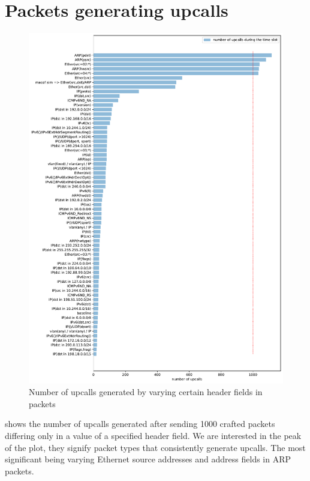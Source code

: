 \section{Packets generating upcalls}
\label{res:upcall-generators}

\begin{figure}
    \centering
    \includegraphics[width=\linewidth]{img/packet_fuzz.pdf}
    \caption{Number of upcalls generated by varying certain header fields in packets}
    \label{fig:plot-packet-fuzz}
\end{figure}

 shows the number of upcalls generated after sending 1000 crafted packets differing only in a value of a specified header field. We are interested in the peak of the plot, they signify packet types that consistently generate upcalls. The most significant being varying Ethernet source addresses and address fields in ARP packets.

